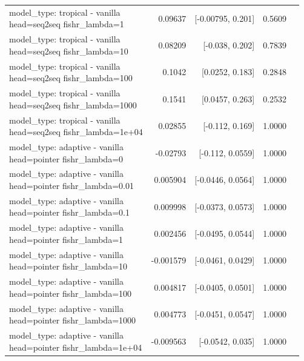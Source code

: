 \documentclass[10pt]{article}
\makeatletter
\newcommand{\stackcell}[1]{\begin{tabular}[t]{@{}l@{}}#1\end{tabular}}
\makeatother
\begin{document}
{\begin{longtable}{lrrrl}
\stackcell{model\_type: tropical - vanilla\\\footnotesize head=seq2seq fishr\_lambda=1 } & 0.09637 & [-0.00795, 0.201] & 0.5609 & \\
\stackcell{model\_type: tropical - vanilla\\\footnotesize head=seq2seq fishr\_lambda=10 } & 0.08209 & [-0.038, 0.202] & 0.7839 & \\
\stackcell{model\_type: tropical - vanilla\\\footnotesize head=seq2seq fishr\_lambda=100 } & 0.1042 & [0.0252, 0.183] & 0.2848 & \\
\stackcell{model\_type: tropical - vanilla\\\footnotesize head=seq2seq fishr\_lambda=1000 } & 0.1541 & [0.0457, 0.263] & 0.2532 & \\
\stackcell{model\_type: tropical - vanilla\\\footnotesize head=seq2seq fishr\_lambda=1e+04 } & 0.02855 & [-0.112, 0.169] & 1.0000 & \\
\stackcell{model\_type: adaptive - vanilla\\\footnotesize head=pointer fishr\_lambda=0 } & -0.02793 & [-0.112, 0.0559] & 1.0000 & \\
\stackcell{model\_type: adaptive - vanilla\\\footnotesize head=pointer fishr\_lambda=0.01 } & 0.005904 & [-0.0446, 0.0564] & 1.0000 & \\
\stackcell{model\_type: adaptive - vanilla\\\footnotesize head=pointer fishr\_lambda=0.1 } & 0.009998 & [-0.0373, 0.0573] & 1.0000 & \\
\stackcell{model\_type: adaptive - vanilla\\\footnotesize head=pointer fishr\_lambda=1 } & 0.002456 & [-0.0495, 0.0544] & 1.0000 & \\
\stackcell{model\_type: adaptive - vanilla\\\footnotesize head=pointer fishr\_lambda=10 } & -0.001579 & [-0.0461, 0.0429] & 1.0000 & \\
\stackcell{model\_type: adaptive - vanilla\\\footnotesize head=pointer fishr\_lambda=100 } & 0.004817 & [-0.0405, 0.0501] & 1.0000 & \\
\stackcell{model\_type: adaptive - vanilla\\\footnotesize head=pointer fishr\_lambda=1000 } & 0.004773 & [-0.0451, 0.0547] & 1.0000 & \\
\stackcell{model\_type: adaptive - vanilla\\\footnotesize head=pointer fishr\_lambda=1e+04 } & -0.009563 & [-0.0542, 0.035] & 1.0000 & \\

\end{longtable}}
\end{document}

